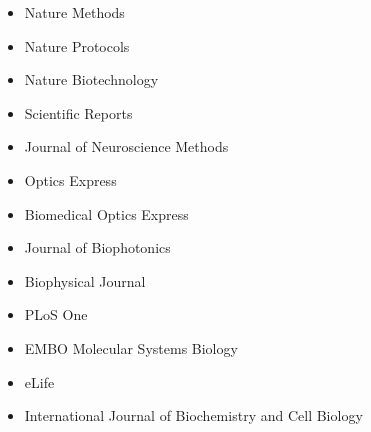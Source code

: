 \begin{itemize}
\item Nature Methods
\item Nature Protocols
\item Nature Biotechnology
\item Scientific Reports
\item Journal of Neuroscience Methods
\item Optics Express
\item Biomedical Optics Express
\item Journal of Biophotonics
\item Biophysical Journal
\item PLoS One
\item EMBO Molecular Systems Biology 
\item eLife
\item International Journal of Biochemistry and Cell Biology
\end{itemize}